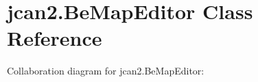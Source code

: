 \hypertarget{classjcan2_1_1_be_map_editor}{}\section{jcan2.\+Be\+Map\+Editor Class Reference}
\label{classjcan2_1_1_be_map_editor}


Collaboration diagram for jcan2.\+Be\+Map\+Editor\+:
